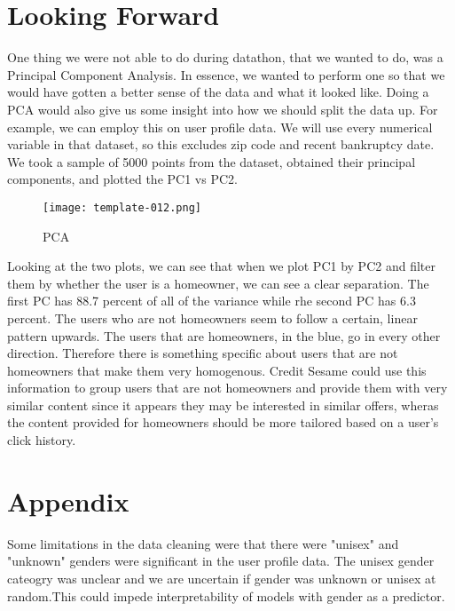 \documentclass[11pt]{llncs}
\begin{document}
\section{Looking Forward}
\label{sec:Looking Forward}

One thing we were not able to do during datathon, that we wanted to do, was a Principal Component Analysis. In essence, we wanted to perform one so that we would have gotten a better sense of the data and what it looked like. Doing a PCA would also give us some insight into how we should split the data up.
For example, we can employ this on user profile data. We will use every numerical variable in that dataset, so this excludes zip code and recent bankruptcy date. We took a sample of 5000 points from the dataset, obtained their principal components, and plotted the PC1 vs PC2.

\begin{figure}[H]
\begin{center}
\texttt{[image: template-012.png]}
\caption{PCA}
\end{center}
\end{figure}

Looking at the two plots, we can see that when we plot PC1 by PC2 and filter them by whether the user is a homeowner, we can see a clear separation. The first PC has 88.7 percent of all of the variance while rhe second PC has 6.3 percent. The users who are not homeowners seem to follow a certain, linear pattern upwards. The users that are homeowners, in the blue, go in every other direction. Therefore there is something specific about users that are not homeowners that make them very homogenous. Credit Sesame could use this information to group users that are not homeowners and provide them with very similar content since it appears they may be interested in similar offers, wheras the content provided for homeowners should be more tailored based on a user's click history.

\newpage

\footnotesize{


}

\newpage

\section*{Appendix}
\appendix

Some limitations in the data cleaning were that there were "unisex" and "unknown" genders were significant in the user profile data. The unisex gender cateogry was unclear and we are uncertain if gender was unknown or unisex at random.This could impede interpretability of models with gender as a predictor. 
\end{document}
